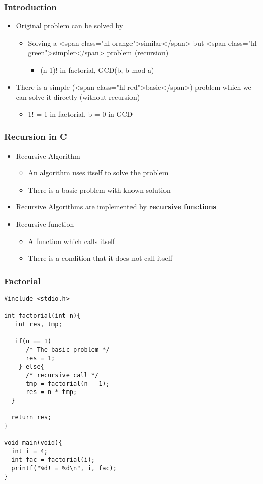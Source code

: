 \documentclass{../c-lecture}
\begin{document}
\begin{frame}
  \frametitle{Introduction}
  \begin{itemize}
    \item Original problem can be solved by
    \begin{itemize}
      \item
        Solving a <span class="hl-orange">similar</span> but
        <span class="hl-green">simpler</span> problem (recursion)

      \begin{itemize}
        \item (n-1)! in factorial, GCD(b, b mod a)
      \end{itemize}
    \end{itemize}
    \item
      There is a simple (<span class="hl-red">basic</span>) problem which we can
      solve it directly (without recursion)

    \begin{itemize}
      \item 1! = 1 in factorial, b = 0 in GCD
    \end{itemize}
  \end{itemize}
\end{frame}

\begin{frame}
  \frametitle{Recursion in C}
  \begin{itemize}
    \item Recursive Algorithm
    \begin{itemize}
      \item An algorithm uses itself to solve the problem
      \item There is a basic problem with known solution
    \end{itemize}
    \item
      Recursive Algorithms are implemented by
      \textbf{\color{Orange} recursive functions}

    \item Recursive function
    \begin{itemize}
      \item A function which calls itself
      \item There is a condition that it does not call itself
    \end{itemize}
  \end{itemize}
\end{frame}

\begin{frame}[fragile]
  \frametitle{Factorial}
  \begin{verbatim}
#include <stdio.h>

int factorial(int n){
   int res, tmp;

   if(n == 1)
      /* The basic problem */
      res = 1;
    } else{
      /* recursive call */
      tmp = factorial(n - 1);
      res = n * tmp;
  }

  return res;
}

void main(void){
  int i = 4;
  int fac = factorial(i);
  printf("%d! = %d\n", i, fac);
}
  \end{verbatim}
\end{frame}
\end{document}
